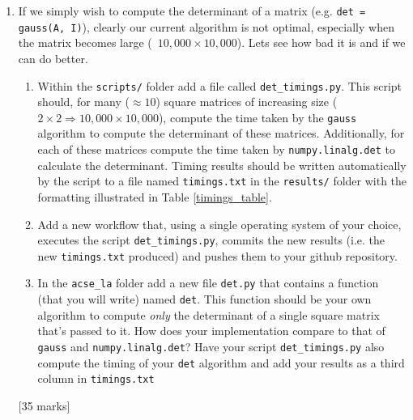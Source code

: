 \documentclass[a4paper,11pt]{article}
\begin{document}
\begin{enumerate}
be placed within the repository in the \texttt{.github/workflows} folder.
\begin{enumerate}
 \item Create a workflow that checks the workflow is PEP8 compliant. The workflow should trigger when
 (at the very least) a push is made the main branch.
 \item Create a workflow that runs \texttt{pytest} on all test files present within the \texttt{tests/}
 folder. The workflow should execute the tests on the following operating systems: (i) Ubuntu 20.04,
 (ii) MacOS 11.0 \& (iii) Windows Server 2019. (You may utilize the default \texttt{Python3} distribution
 available on those operating systems).
\end{enumerate}
[25 marks]
\item If we simply wish to compute the determinant of a matrix (e.g. \texttt{det = gauss(A, I)}),
clearly our current algorithm is not optimal, especially when the matrix becomes large
(~$10,000 \times 10,000$). Lets see how bad it is and if we can do better.
\begin{enumerate}
 \item Within the \texttt{scripts/} folder add a file called \texttt{det\_timings.py}. This script should,
 for many ($\approx10$) square matrices of increasing size ($2 \times 2 \Rightarrow 10,000 \times 10,000$), compute
 the time taken by the \texttt{gauss} algorithm
 to compute the determinant of these matrices. Additionally, for each of these matrices compute the time taken by
 \texttt{numpy.linalg.det} to calculate the determinant. Timing results should be
 written automatically by the script to a file named \texttt{timings.txt} in the \texttt{results/} folder with the
 formatting illustrated in Table \ref{timings_table}.
 \item Add a new workflow that, using a single operating system of your choice, executes the
 script \texttt{det\_timings.py}, commits the new results (i.e. the new \texttt{timings.txt} produced)
 and pushes them to your github repository.
 \item In the \texttt{acse\_la} folder add a new file \texttt{det.py} that contains a function (that you will write) named
 \texttt{det}. This function should be your own algorithm to compute \textit{only} the determinant
 of a single square matrix that's passed to it. How does your implementation compare to that of \texttt{gauss}
 and \texttt{numpy.linalg.det}? Have your script \texttt{det\_timings.py} also compute the timing of your
 \texttt{det} algorithm and add your results as a third column in \texttt{timings.txt}
\end{enumerate}
[35 marks]
\end{enumerate}
\end{document}
